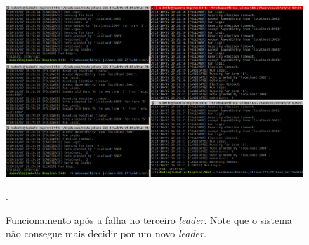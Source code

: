 \documentclass[journal,onecolumn]{IEEEtran}
\begin{document}
\begin{figure}[H]
\centering
\centerline{\includegraphics[scale=0.4]{imagens/3_falhas.png}}
\caption{Funcionamento após a falha no terceiro \textit{leader}. Note que o sistema não consegue mais decidir por um novo \textit{leader}.}.
\label{3_falhas}
\end{figure}
\end{document}
